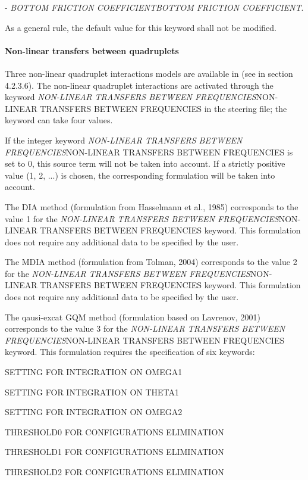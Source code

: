   - \textit{BOTTOM FRICTION COEFFICIENTBOTTOM FRICTION COEFFICIENT}.

 As a general rule, the default value for this keyword shall not be modified.


\paragraph{ Non-linear transfers between quadruplets}

 Three non-linear quadruplet interactions models are available in \tomawac (see in section 4.2.3.6). The non-linear quadruplet interactions are activated through the keyword \textit{NON-LINEAR TRANSFERS BETWEEN FREQUENCIES}NON-LINEAR TRANSFERS BETWEEN FREQUENCIES\textit{ }in the steering file; the keyword can take four values.

 If the integer keyword \textit{NON-LINEAR TRANSFERS BETWEEN FREQUENCIES}NON-LINEAR TRANSFERS BETWEEN FREQUENCIES is set to 0, this source term will not be taken into account. If a strictly positive value (1, 2, ...) is chosen, the corresponding formulation will be taken into account.

 The DIA method (formulation from Hasselmann et al., 1985) corresponds to the value 1 for the \textit{NON-LINEAR TRANSFERS BETWEEN FREQUENCIES}NON-LINEAR TRANSFERS BETWEEN FREQUENCIES keyword. This formulation does not require any additional data to be specified by the user.

 The MDIA method (formulation from Tolman, 2004) corresponds to the value 2 for the \textit{NON-LINEAR TRANSFERS BETWEEN FREQUENCIES}NON-LINEAR TRANSFERS BETWEEN FREQUENCIES keyword. This formulation does not require any additional data to be specified by the user.

 The qausi-excat GQM method (formulation based on Lavrenov, 2001) corresponds to the value 3 for the \textit{NON-LINEAR TRANSFERS BETWEEN FREQUENCIES}NON-LINEAR TRANSFERS BETWEEN FREQUENCIES keyword. This formulation requires the specification of six keywords:

 SETTING FOR INTEGRATION ON OMEGA1

 SETTING FOR INTEGRATION ON THETA1

 SETTING FOR INTEGRATION ON OMEGA2

 THRESHOLD0 FOR CONFIGURATIONS ELIMINATION

 THRESHOLD1 FOR CONFIGURATIONS ELIMINATION

 THRESHOLD2 FOR CONFIGURATIONS ELIMINATION





